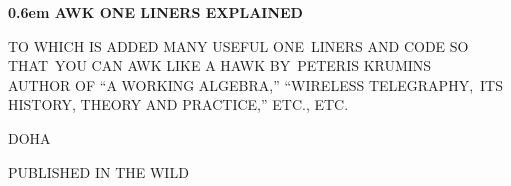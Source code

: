 \documentclass{book}
\begin{document}
\clearpage
\newcommand\nbvspace[1][3]{\vspace*{\stretch{#1}}}
\newcommand\nbstretchyspace{\spaceskip0.5em plus 0.25em minus 0.25em}
\newcommand{\nbtitlestretch}{\spaceskip0.6em}
\pagestyle{empty}
\begin{center}
\bfseries
\nbvspace[1]
\Huge
{\nbtitlestretch\huge
AWK ONE LINERS EXPLAINED}

\nbvspace[1]
\normalsize

TO WHICH IS ADDED MANY USEFUL ONE\    LINERS AND CODE SO THAT\    YOU CAN AWK LIKE A HAWK
\nbvspace[1]
\small BY\    \Large PETERIS KRUMINS\\[0.5em]
\footnotesize AUTHOR OF ``A WORKING ALGEBRA,'' ``WIRELESS TELEGRAPHY,\    ITS HISTORY, THEORY AND PRACTICE,'' ETC., ETC.

\nbvspace[2]

\nbvspace[3]
\normalsize

DOHA\    \large

PUBLISHED IN THE WILD
\nbvspace[1]
\end{center}
\end{document}
